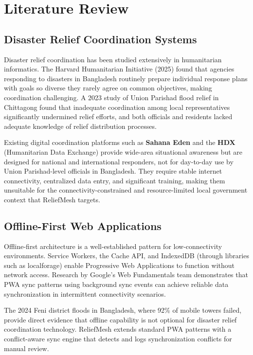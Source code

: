 \chapter{Literature Review}

\section{Disaster Relief Coordination Systems}

Disaster relief coordination has been studied extensively in humanitarian informatics. The Harvard Humanitarian Initiative (2025) found that agencies responding to disasters in Bangladesh routinely prepare individual response plans with goals so diverse they rarely agree on common objectives, making coordination challenging. A 2023 study of Union Parishad flood relief in Chittagong found that inadequate coordination among local representatives significantly undermined relief efforts, and both officials and residents lacked adequate knowledge of relief distribution processes.

Existing digital coordination platforms such as \textbf{Sahana Eden} and the \textbf{HDX} (Humanitarian Data Exchange) provide wide-area situational awareness but are designed for national and international responders, not for day-to-day use by Union Parishad-level officials in Bangladesh. They require stable internet connectivity, centralized data entry, and significant training, making them unsuitable for the connectivity-constrained and resource-limited local government context that ReliefMesh targets.

\section{Offline-First Web Applications}

Offline-first architecture is a well-established pattern for low-connectivity environments. Service Workers, the Cache API, and IndexedDB (through libraries such as localforage) enable Progressive Web Applications to function without network access. Research by Google's Web Fundamentals team demonstrates that PWA sync patterns using background sync events can achieve reliable data synchronization in intermittent connectivity scenarios.

The 2024 Feni district floods in Bangladesh, where 92\% of mobile towers failed, provide direct evidence that offline capability is not optional for disaster relief coordination technology. ReliefMesh extends standard PWA patterns with a conflict-aware sync engine that detects and logs synchronization conflicts for manual review.

